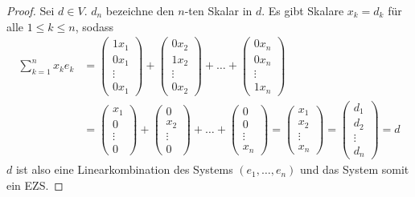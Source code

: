 \documentclass[a4paper,10pt]{article}
\begin{document}
\begin{proof}
 Sei $d \in V$.
 $d_n$ bezeichne den $n$-ten Skalar in $d$.
 Es gibt Skalare $x_k = d_k$ für alle $1 \le k \le n$, sodass
 \begin{align*}
  \sum_{k = 1}^n x_ke_k & = \begin{pmatrix}1x_1\\0x_1\\\vdots\\0x_1\end{pmatrix} + \begin{pmatrix}0x_2\\1x_2\\\vdots\\0x_2\end{pmatrix} + \dots + \begin{pmatrix}0x_n\\0x_n\\\vdots\\1x_n\end{pmatrix}\\
  & = \begin{pmatrix}x_1\\0\\\vdots\\0\end{pmatrix} + \begin{pmatrix}0\\x_2\\\vdots\\0\end{pmatrix} + \dots + \begin{pmatrix}0\\0\\\vdots\\x_n\end{pmatrix} = \begin{pmatrix}x_1\\x_2\\\vdots\\x_n\end{pmatrix} = \begin{pmatrix}d_1\\d_2\\\vdots\\d_n\end{pmatrix} = d
 \end{align*}
 $d$ ist also eine Linearkombination des Systems $(e_1, \dots, e_n)$ und das System somit ein EZS.
 

\end{proof}
\end{document}

